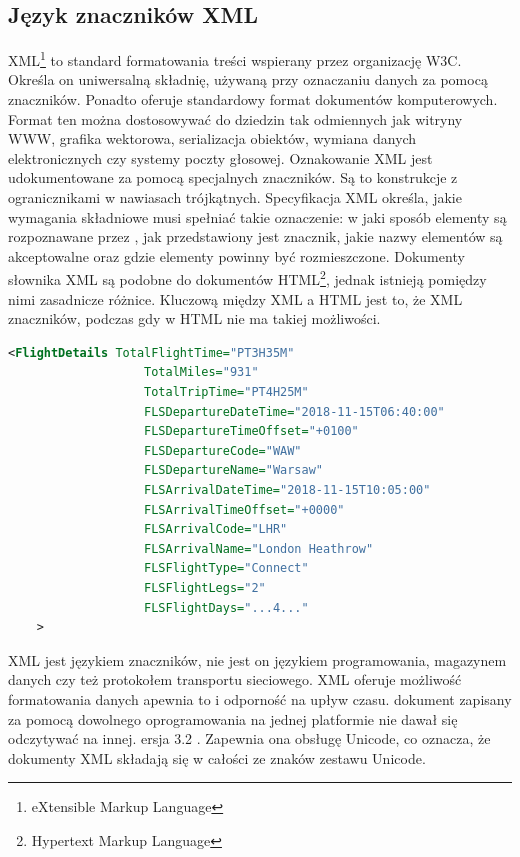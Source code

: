 \documentclass[12pt, twoside]{report}
\begin{document}
\subsection{Język znaczników XML}
XML\footnote{eXtensible Markup Language} to standard formatowania treści wspierany przez organizację W3C. Określa on uniwersalną składnię, używaną przy oznaczaniu danych za pomocą znaczników. Ponadto oferuje standardowy format dokumentów komputerowych. Format ten można dostosowywać do dziedzin tak odmiennych jak witryny WWW, grafika wektorowa, serializacja obiektów, wymiana danych elektronicznych czy systemy poczty głosowej. Oznakowanie XML jest udokumentowane za pomocą specjalnych znaczników. Są to konstrukcje z ogranicznikami w nawiasach trójkątnych. Specyfikacja XML określa, jakie wymagania składniowe musi spełniać takie oznaczenie: w jaki sposób elementy są rozpoznawane przez , jak przedstawiony jest znacznik, jakie nazwy elementów są akceptowalne oraz gdzie elementy powinny być rozmieszczone. Dokumenty słownika XML są podobne do dokumentów HTML\footnote{Hypertext Markup Language}, jednak istnieją pomiędzy nimi zasadnicze różnice. Kluczową  między XML a HTML jest to, że XML   znaczników, podczas gdy w HTML nie ma takiej możliwości\cite{xml}.

\begin{lstlisting}[language=XML, caption=Fragment danych w formacie XML, label=list::xml]
    <FlightDetails TotalFlightTime="PT3H35M"
                   TotalMiles="931"
                   TotalTripTime="PT4H25M"
                   FLSDepartureDateTime="2018-11-15T06:40:00"
                   FLSDepartureTimeOffset="+0100"
                   FLSDepartureCode="WAW"
                   FLSDepartureName="Warsaw"
                   FLSArrivalDateTime="2018-11-15T10:05:00"
                   FLSArrivalTimeOffset="+0000"
                   FLSArrivalCode="LHR"
                   FLSArrivalName="London Heathrow"
                   FLSFlightType="Connect"
                   FLSFlightLegs="2"
                   FLSFlightDays="...4..."
    >
\end{lstlisting}

XML jest językiem znaczników, nie jest on językiem programowania, magazynem danych czy też protokołem transportu sieciowego. XML oferuje możliwość formatowania danych apewnia to  i odporność na upływ czasu.  dokument zapisany za pomocą dowolnego oprogramowania na jednej platformie nie dawał się odczytywać na innej. ersja 3.2 . Zapewnia ona obsługę Unicode, co oznacza, że dokumenty XML składają się w całości ze znaków  zestawu  Unicode. 
\end{document}
